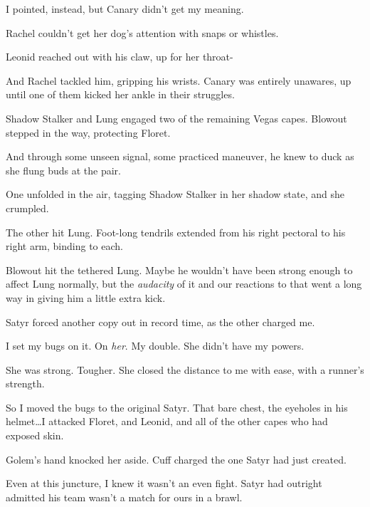 I pointed, instead, but Canary didn't get my meaning.



Rachel couldn't get her dog's attention with snaps or whistles.



Leonid reached out with his claw, up for her throat-



And Rachel tackled him, gripping his wrists.  Canary was entirely unawares, up until one of them kicked her ankle in their struggles.



Shadow Stalker and Lung engaged two of the remaining Vegas capes.  Blowout stepped in the way, protecting Floret.



And through some unseen signal, some practiced maneuver, he knew to duck as she flung buds at the pair.



One unfolded in the air, tagging Shadow Stalker in her shadow state, and she crumpled.



The other hit Lung.  Foot-long tendrils extended from his right pectoral to his right arm, binding to each.



Blowout hit the tethered Lung.  Maybe he wouldn't have been strong enough to affect Lung normally, but the \emph{audacity }of it and our reactions to that went a long way in giving him a little extra kick.



Satyr forced another copy out in record time, as the other charged me.



I set my bugs on it.  On \emph{her}.  My double.  She didn't have my powers.



She was strong.  Tougher.  She closed the distance to me with ease, with a runner's strength.



So I moved the bugs to the original Satyr.  That bare chest, the eyeholes in his helmet\ldots  I attacked Floret, and Leonid, and all of the other capes who had exposed skin.



Golem's hand knocked her aside.  Cuff charged the one Satyr had just created.



Even at this juncture, I knew it wasn't an even fight.  Satyr had outright admitted his team wasn't a match for ours in a brawl.



